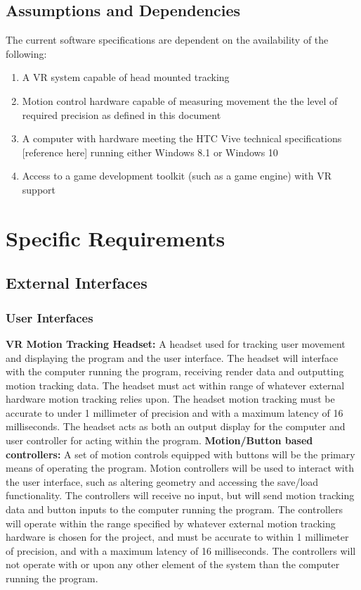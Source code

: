 \documentclass[onecolumn, draftclsnofoot,10pt, compsoc]{IEEEtran}
\begin{document}
\subsection{Assumptions and Dependencies}
The current software specifications are dependent on the availability of the following:
\begin{enumerate}
	\item A VR system capable of head mounted tracking
	\item Motion control hardware capable of measuring movement the the level of required precision as defined in this document
	\item A computer with hardware meeting the HTC Vive technical specifications [reference here] running either Windows 8.1 or Windows 10
	\item Access to a game development toolkit (such as a game engine) with VR support
\end{enumerate}
\section{Specific Requirements}
\subsection{External Interfaces}
\subsubsection{User Interfaces}
\textbf{VR Motion Tracking Headset:}
\newline
A headset used for tracking user movement and displaying the program and the user interface. The headset will interface with the computer running the program, receiving render data and outputting motion tracking data. The headset must act within range of whatever external hardware motion tracking relies upon. The headset motion tracking must be accurate to under 1 millimeter of precision and with a maximum latency of 16 milliseconds. The headset acts as both an output display for the computer and user controller for acting within the program. 
\newline
\textbf{Motion/Button based controllers:}
\newline
A set of motion controls equipped with buttons will be the primary means of operating the program. Motion controllers will be used to interact with the user interface, such as altering geometry and accessing the save/load functionality. 
The controllers will receive no input, but will send motion tracking data and button inputs to the computer running the program. The controllers will operate within the range specified by whatever external motion tracking hardware is chosen for the project, and must be accurate to within 1 millimeter of precision, and with a maximum latency of 16 milliseconds. The controllers will not operate with or upon any other element of the system than the computer running the program.
\end{document}
